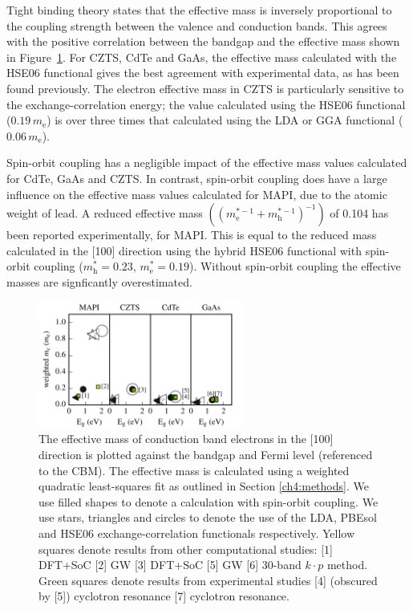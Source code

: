 Tight binding theory states that the effective mass is inversely proportional to the coupling strength between the valence and conduction bands.\autocite{Kittel2005} 
This agrees with the positive correlation between the bandgap and the effective mass shown in Figure\ \ref{m*_bandgap_plot}.
For CZTS, CdTe and GaAs, the effective mass calculated with the HSE06 functional gives the best agreement with experimental data, as has been found previously.\autocite{Kim2010} 
The electron effective mass in CZTS is particularly sensitive to the exchange-correlation energy; the value calculated using the HSE06 functional ($0.19\,m_{\text{e}}$) is over three times that calculated using the LDA or GGA functional ($0.06\,m_\text{e}$).

Spin-orbit coupling has a negligible impact of the effective mass values calculated for CdTe, GaAs and CZTS.
In contrast, spin-orbit coupling does have a large influence on the effective mass values calculated for MAPI, due to the atomic weight of lead. 
A reduced effective mass $((m^{*-1}_{\text{e}}+m^{*-1}_{\text{h}})^{-1})$ of 0.104 has been reported experimentally,\autocite{Miyata2015} for MAPI.
This is equal to the reduced mass calculated in the [100] direction using the hybrid HSE06 functional with spin-orbit coupling ($m^*_{\text{h}}=0.23$, $m^*_{\text{e}}=0.19$). 
Without spin-orbit coupling the effective masses are signficantly overestimated. 

\begin{figure}[tb] \centering
\includegraphics[width=0.6\textwidth]{./figures/ch4/m__bandgap_plot.pdf}
\caption[Effective mass vs bandgap]{\label{m*_bandgap_plot}The effective mass of conduction band electrons in the [100] direction is plotted against the bandgap and Fermi level (referenced to the CBM). The effective mass is calculated using a weighted quadratic least-squares fit as outlined in Section \ref{ch4:methods}. We use filled shapes to denote a calculation with spin-orbit coupling. We use stars, triangles and circles to denote the use of the LDA, PBEsol and HSE06 exchange-correlation functionals respectively. Yellow squares denote results from other computational studies: [1] DFT+SoC\autocite{Filip2015} [2] GW\autocite{Filip2015} [3] DFT+SoC\autocite{Liu2012} [5] GW\autocite{Deguchi2016}  [6] 30-band $k\cdot p$ method.\autocite{Richard2004} Green squares denote results from experimental studies [4] (obscured by [5]) cyclotron resonance\autocite{Madelung2004} [7] cyclotron resonance.\autocite{Madelung2004}}
\end{figure}

